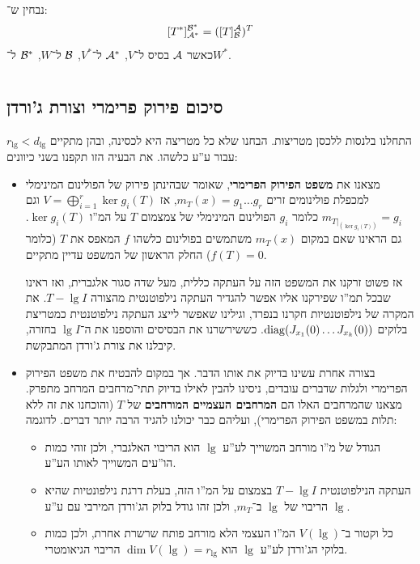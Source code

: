 \documentclass[name=רשימות אלגברה לינארית 2א]{../../../tex/classes/megasumPreamble}
\begin{document}
	נבחין ש־: 
	\[ [T^*]^{\mathcal{B}^*}_{\mathcal{A}^*} = ([T]^{\mathcal{A}}_{\mathcal{B}})^T \]
	כאשר $\mathcal{A}$ בסיס ל־$V$, $\mathcal{A}^*$ ל־$V^*$, $\mathcal{B}$ ל־$W$, $\mathcal{B}^*$ ל־$W^*$. 
	
	
	\npage
	
	
	\section[סיכום תוצאות מרכזיות]{}
	\subsection{סיכום פירוק פרימרי וצורת ג'ורדן}
	התחלנו בלנסות ללכסן מטריצות. הבחנו שלא כל מטריצה היא לכסינה, ובהן מתקיים $r_\lg < d_\lg$ עבור ע''ע כלשהו. את הבעיה הזו תקפנו בשני כיוונים: 
	\begin{itemize}
		\item מצאנו את \textbf{משפט הפירוק הפרימרי}, שאומר שבהינתן פירוק של הפולינום המינימלי למכפלת פולינומים זרים $m_T(x) = g_1 \dots g_r$, אז $V = \bigoplus_{i = 1}^{r}\ker g_i(T)$ וגם $m_{T|_(\ker g_i(T))} = g_i$ כלומר $g_i$ הפולינום המינימלי של צמצמום $T$ על המ''ו $\ker g_i(T)$. גם הראינו שאם במקום $m_T(x)$ משתמשים בפולינום כלשהו $f$ המאפס את $T$ (כלומר $f(T) = 0$) החלק הראשון של המשפט עדיין מתקיים. 
		
		אז פשוט זרקנו את המשפט הזה על העתקה כללית, מעל שדה סגור אלגברית, ואז ראינו שבכל תמ''ו שפירקנו אליו אפשר להגדיר העתקה נילפוטנטית מהצורה $T - \lg I$. את המקרה של נילפוטנטיות חקרנו בנפרד, וגילינו שאפשר לייצג העתקה נילפוטנטית כמטריצת בלוקים $\operatorname{diag}(J_{x_1}(0) \dots J_{x_k}(0))$. כששירשרנו את הבסיסים והוספנו את ה־$\lg I$ בחזרה, קיבלנו את צורת ג'ורדן המתבקשת.
		\item בצורה אחרת עשינו בדיוק את אותו הדבר. אך במקום להבטיח את משפט הפירוק הפרימרי ולגלות שדברים עובדים, ניסינו להבין לאילו בדיוק תתי־מרחבים המרחב מתפרק. מצאנו שהמרחבים האלו הם \textbf{המרחבים העצמיים המורחבים} של $T$ (והוכחנו את זה ללא תלות במשפט הפירוק הפרימרי), ועליהם כבר יכולנו להגיד הרבה יותר דברים. לדוגמה: 
		\begin{itemize}
			\item הגודל של מ''ו מורחב המשוייך לע''ע $\lg$ הוא הריבוי האלגברי, ולכן זוהי כמות הו''עים המשוייך לאותו הע''ע.
			\item העתקה הנילפוטנטית $T - \lg I$ בצמצום על המ''ו הזה, בעלת דרגת נילפונטיות שהיא הריבוי של $\lg$ ב־$m_T$, ולכן זהו גודל בלוק הג'ורדן המירבי עם ע''ע $\lg$.
			\item כל וקטור ב־$V(\lg)$ המ''ו העצמי הלא מורחב פותח שרשרת אחרת, ולכן כמות בלוקי הג'ורדן לע''ע $\lg$ הוא $\dim V(\lg) = r_\lg$ הריבוי הגיאומטרי. 
		\end{itemize}
	\end{itemize}
	
\end{document}
